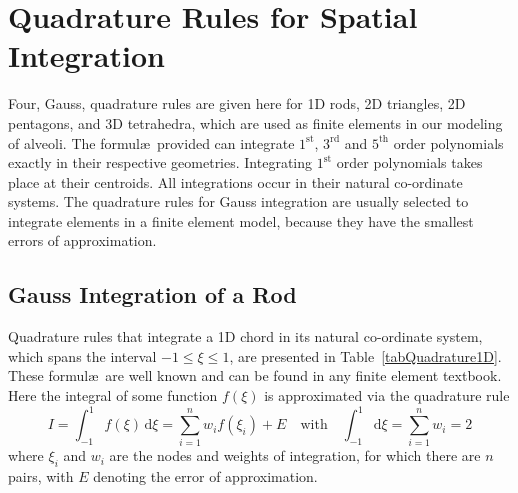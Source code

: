 \section{Quadrature Rules for Spatial Integration}
\label{secGauss}

Four, Gauss, quadrature rules are given here for 1D rods, 2D triangles, 2D pentagons, and 3D tetrahedra, which are used as finite elements in our modeling of alveoli.  The formul\ae\ provided can integrate $1^{\text{st}}$, $3^{\text{rd}}$ and $5^{\text{th}}$ order polynomials exactly in their respective geometries.  Integrating $1^{\text{st}}$ order polynomials takes place at their centroids.  All integrations occur in their natural co-ordinate systems.  The quadrature rules for Gauss integration are usually selected to integrate elements in a finite element model, because they have the smallest errors of approximation.

\subsection{Gauss Integration of a Rod}

Quadrature rules that integrate a 1D chord in its natural co-ordinate system, which spans the interval $-1 \leq \xi \leq 1$, are presented in Table~\ref{tabQuadrature1D}.  These formul\ae\ are well known and can be found in any finite element textbook.  Here the integral of some function $f( \xi )$ is approximated via the quadrature rule
\begin{equation}
    I = \int_{-1}^1 f ( \xi ) \, \mathrm{d} \xi 
    = \sum_{i=1}^n w_i f( \xi_i ) + E
    \quad \text{with} \quad
    \int_{-1}^1 \mathrm{d} \xi = \sum_{i=1}^n w_i = 2
    \label{Gauss1D}
\end{equation}
where $\xi_i$ and $w_i$ are the nodes and weights of integration, for which there are $n$ pairs, with $E$ denoting the error of approximation.

